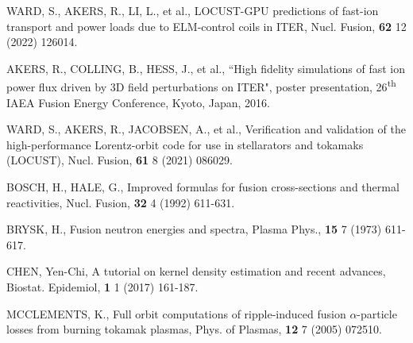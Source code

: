 \documentclass[10pt, a4paper, twoside]{article}
\begin{document}
\begin{thebibliography}{9}
    WARD, S., AKERS, R., LI, L., et al.,
    LOCUST-GPU predictions of fast-ion transport and power loads due to ELM-control coils in ITER,
    Nucl. Fusion,
    \textbf{62} 12
    (2022)
    126014.

    AKERS, R., COLLING, B., HESS, J., et al.,
    ``High fidelity simulations of fast ion power flux driven by 3D field perturbations on ITER",
    poster presentation, 
    26\textsuperscript{th} IAEA Fusion Energy Conference,
    Kyoto, Japan, 
    2016.

    WARD, S., AKERS, R., JACOBSEN, A., et al.,
    Verification and validation of the high-performance Lorentz-orbit code for use in stellarators and tokamaks (LOCUST),
    Nucl. Fusion,
    \textbf{61} 8
    (2021)
    086029.

    BOSCH, H., HALE, G.,
    Improved formulas for fusion cross-sections and thermal reactivities,
    Nucl. Fusion,
    \textbf{32} 4
    (1992)
    611-631.

    BRYSK, H.,
    Fusion neutron energies and spectra,
    Plasma Phys.,
    \textbf{15} 7
    (1973)
    611-617.

    CHEN, Yen-Chi,
    A tutorial on kernel density estimation and recent advances,
    Biostat. Epidemiol,
    \textbf{1} 1
    (2017)
    161-187.

    MCCLEMENTS, K.,
    Full orbit computations of ripple-induced fusion $\alpha$-particle losses from burning tokamak plasmas,
    Phys. of Plasmas,
    \textbf{12} 7
    (2005)
    072510.


\end{thebibliography}
\end{document}
